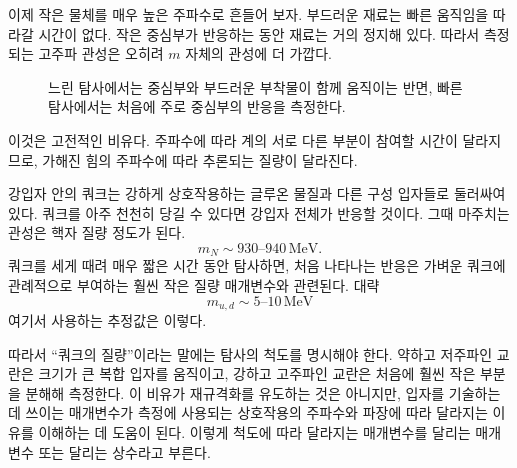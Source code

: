 이제 작은 물체를 매우 높은 주파수로 흔들어 보자. 부드러운 재료는 빠른 움직임을 따라갈 시간이 없다. 작은 중심부가 반응하는 동안 재료는 거의 정지해 있다. 따라서 측정되는 고주파 관성은 오히려 \(m\) 자체의 관성에 더 가깝다.

\begin{figure}[h]
\centering
{}
\caption{느린 탐사에서는 중심부와 부드러운 부착물이 함께 움직이는 반면, 빠른 탐사에서는 처음에 주로 중심부의 반응을 측정한다.}
\end{figure}

이것은 고전적인 비유다. 주파수에 따라 계의 서로 다른 부분이 참여할 시간이 달라지므로, 가해진 힘의 주파수에 따라 추론되는 질량이 달라진다.

강입자 안의 쿼크는 강하게 상호작용하는 글루온 물질과 다른 구성 입자들로 둘러싸여 있다. 쿼크를 아주 천천히 당길 수 있다면 강입자 전체가 반응할 것이다. 그때 마주치는 관성은 핵자 질량 정도가 된다.
\begin{equation}
m_N\sim930\text{--}940\,\mathrm{MeV}.
\end{equation}
쿼크를 세게 때려 매우 짧은 시간 동안 탐사하면, 처음 나타나는 반응은 가벼운 쿼크에 관례적으로 부여하는 훨씬 작은 질량 매개변수와 관련된다. 대략
\begin{equation}
m_{u,d}\sim5\text{--}10\,\mathrm{MeV}
\end{equation}
여기서 사용하는 추정값은 이렇다.

따라서 ``쿼크의 질량''이라는 말에는 탐사의 척도를 명시해야 한다. 약하고 저주파인 교란은 크기가 큰 복합 입자를 움직이고, 강하고 고주파인 교란은 처음에 훨씬 작은 부분을 분해해 측정한다. 이 비유가 재규격화를 유도하는 것은 아니지만, 입자를 기술하는 데 쓰이는 매개변수가 측정에 사용되는 상호작용의 주파수와 파장에 따라 달라지는 이유를 이해하는 데 도움이 된다. 이렇게 척도에 따라 달라지는 매개변수를 달리는 매개변수 또는 달리는 상수라고 부른다.

\begin{classroomqa}
\end{classroomqa}

